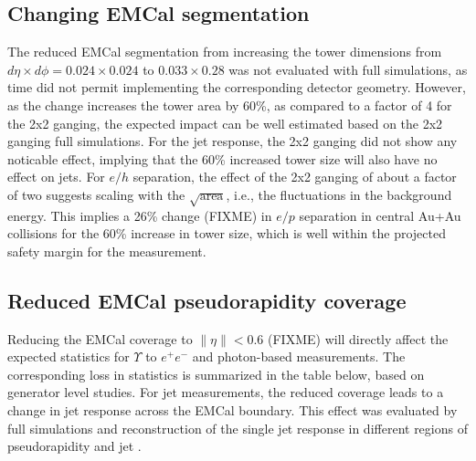 \subsection{Changing EMCal segmentation}
The reduced EMCal segmentation from increasing the tower dimensions
from $d\eta \times d\phi = 0.024 \times 0.024$ to $0.033 \times 0.28$
was not evaluated with full \geant simulations, as time did not permit
implementing the corresponding detector geometry. However, as the
change increases the tower area by 60\%, as compared to a factor of 4
for the 2x2 ganging, the expected impact can be well estimated based
on the 2x2 ganging full simulations. For the jet response, the 2x2
ganging did not show any noticable effect, implying that the 60\%
increased tower size will also have no effect on jets. For $e/h$
separation, the effect of the 2x2 ganging of about a factor of two
suggests scaling with the $\sqrt{\mbox{area}}$, i.e., the fluctuations
in the background energy. This implies a 26\% change (FIXME) in $e/p$
separation in central Au+Au collisions for the 60\% increase in tower
size, which is well within the projected safety margin for the
measurement.

\subsection{Reduced EMCal pseudorapidity coverage}
Reducing the EMCal coverage to $\| \eta \| < 0.6$ (FIXME) will directly affect the expected statistics for $\Upsilon$ to $e^+ e^-$ and photon-based measurements. The 
corresponding loss in statistics is summarized in the table below, based on generator level studies. For jet measurements, the reduced 
coverage leads to a change in jet response across the EMCal boundary. This effect was evaluated by full \geant simulations and reconstruction
of the single jet response in different regions of pseudorapidity and jet \pt.


